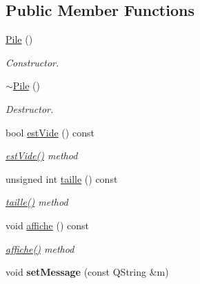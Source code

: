 \subsection*{Public Member Functions}
\begin{DoxyCompactItemize}
\item 
\hyperlink{class_pile_ab44e927107b28f5f3ac7697d10e0a739}{Pile} ()
\begin{DoxyCompactList}\small\item\em Constructor. \end{DoxyCompactList}\item 
\hyperlink{class_pile_ab2d1398d675586ff34994e2b109df152}{$\sim$\+Pile} ()
\begin{DoxyCompactList}\small\item\em Destructor. \end{DoxyCompactList}\item 
bool \hyperlink{class_pile_a2ca7edab82a4b7a4305093dd9ab14d71}{est\+Vide} () const 
\begin{DoxyCompactList}\small\item\em \hyperlink{class_pile_a2ca7edab82a4b7a4305093dd9ab14d71}{est\+Vide()} method \end{DoxyCompactList}\item 
unsigned int \hyperlink{class_pile_ac332a47f6d204fe280f199d76893036a}{taille} () const 
\begin{DoxyCompactList}\small\item\em \hyperlink{class_pile_ac332a47f6d204fe280f199d76893036a}{taille()} method \end{DoxyCompactList}\item 
void \hyperlink{class_pile_a874f209b5333810e6179b0061304b4e5}{affiche} () const 
\begin{DoxyCompactList}\small\item\em \hyperlink{class_pile_a874f209b5333810e6179b0061304b4e5}{affiche()} method \end{DoxyCompactList}\item 
void {\bfseries set\+Message} (const Q\+String \&m)\hypertarget{class_pile_adf9495ba02a31d3be1bb8bc5763ec50f}{}\label{class_pile_adf9495ba02a31d3be1bb8bc5763ec50f}


\end{DoxyCompactItemize}
